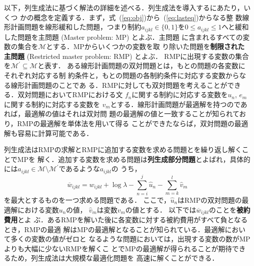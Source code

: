 \documentclass[japanese]{jnlp_1.4}
\begin{document}
以下，列生成法に基づく解法の詳細を述べる．列生成法を導入するにあたり，いくつ
かの概念を定義する．まず，式~(\ref{eq:obj})から~(\ref{eq:lasteq})からなる整
数線形計画問題を線形緩和した問題，つまり制約$a_{ijkl} \in \{0, 1\}$を$0 \leq
a_{ijkl} \leq 1$へと緩和した問題を主問題 (Master problem: MP) とよぶ．主問題
に含まれるすべての変数の集合を$\mathcal{M}$とする．MPからいくつかの変数を取
り除いた問題を\textbf{制限された主問題} (Restricted master problem: RMP) とよぶ．
RMPに出現する変数の集合を$\mathcal{M}^{\prime} \subseteq \mathcal{M}$と表す．
ある線形計画問題の双対問題とは，もとの問題の各変数にそれぞれ対応する制
約条件と，もとの問題の各制約条件に対応する変数からなる線形計画問題のことであ
る．RMPに対しても双対問題を考えることができる．双対問題においてRMPにおける文
$f_n$に関する制約に対応する変数を$u_n$, $e_m$に関する制約に対応する変数を
$v_m$とする．線形計画問題が最適解を持つのであれば，最適解の値はそれは双対問
題の最適解の値と一致することが知られており，RMPの最適解を単体法を用いて得る
ことができたならば，双対問題の最適解も容易に計算可能である．

列生成法はRMPの求解とRMPに追加する変数を求める問題とを繰り返し解くことでMPを
解く．追加する変数を求める問題は\textbf{列生成部分問題}とよばれ，具体的には$a_{ijkl}
\in \mathcal{M} \setminus \mathcal{M}^{\prime}$であるような$a_{ijkl}$の
\pagebreak
うち，
\begin{equation}
\label{eq:1}
\overline{w}_{ijkl}  = w_{ijkl} + \log \lambda - \sum_{n=i}^{j}\hat{u}_{n} - \sum_{m=k}^{l}\hat{v}_{m}
\end{equation}
を最大とするものを一つ求める問題である．
ここで，$\hat{u}_n$はRMPの双対問題の最適解における変数$u_n$の値，
$\hat{v}_m$は変数$v_m$の値とする．
以下では$\overline{w}_{ijkl}$のことを\textbf{被約費用}とよ
ぶ．あるRMPを解いた後に各変数に対する被約費用がすべて負となるとき，RMPの最適
解はMPの最適解となることが知られている．最適解において多くの変数の値がゼロと
なるような問題においては，出現する変数の数がMPよりも大幅に少ないRMPを解くこ
とでMPの最適解が得られることが期待できるため，列生成法は大規模な最適化問題を
高速に解くことができる．
\end{document}
